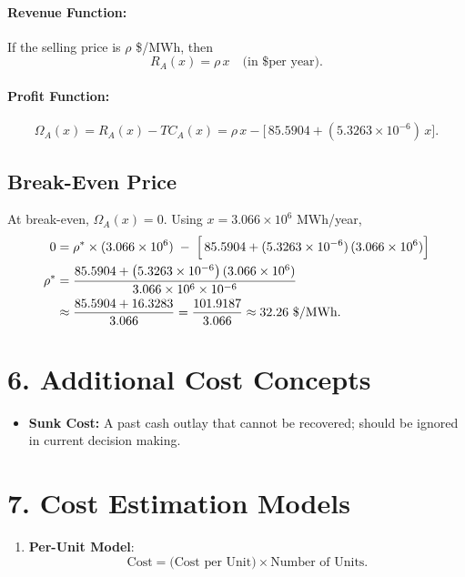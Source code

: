 \documentclass[11pt]{article}
\begin{document}
\paragraph{Revenue Function:}
If the selling price is \(\rho\) \$/MWh, then
\begin{equation}
  R_A(x) = \rho \, x \quad\text{(in \$ per year).}
  \label{eq:annual-rev}
\end{equation}

\paragraph{Profit Function:}
\begin{equation}
  \Omega_A(x) 
  = R_A(x) - TC_A(x)
  = \rho\,x - \bigl[\,85.5904 + (5.3263 \times 10^{-6})\,x \bigr].
  \label{eq:profit}
\end{equation}

\subsection*{Break-Even Price}

At break-even, \(\Omega_A(x) = 0\). Using \(x = 3.066 \times 10^{6}\) MWh/year,
\begin{align}
  0 
  &= \rho^* \times (3.066 \times 10^{6})
    \;-\; \Bigl[\,85.5904 + (5.3263 \times 10^{-6})\,(3.066 \times 10^{6})\Bigr] 
  \nonumber\\
  \rho^* 
  &= \frac{85.5904 + \bigl(5.3263 \times 10^{-6}\bigr)\,(3.066 \times 10^{6})}
         {\,3.066 \times 10^{6}\times 10^{-6}\,} 
  \label{eq:breakeven-price} \\
  &\approx \frac{85.5904 + 16.3283}{3.066}
  = \frac{101.9187}{3.066}
  \approx 32.26~\$/\text{MWh}.
  \nonumber
\end{align}

\section*{6. Additional Cost Concepts}

\begin{itemize}
  \item \textbf{Sunk Cost:} A past cash outlay that cannot be recovered; should be ignored in current decision making.
  \end{itemize}
\section*{7. Cost Estimation Models}

\begin{enumerate}
  \item \textbf{Per-Unit Model}: 
    \[
      \text{Cost} = \text{(Cost per Unit)} \times \text{Number of Units}.
    \]
\end{enumerate}
\end{document}

